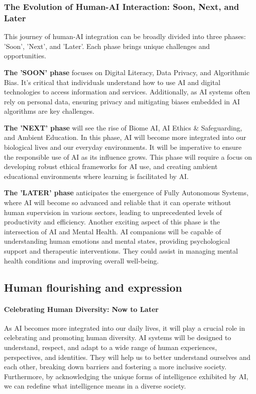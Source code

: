 \subsubsection{The Evolution of Human-AI Interaction: Soon, Next, and Later}
This journey of human-AI integration can be broadly divided into three phases: 'Soon', 'Next', and 'Later'. Each phase brings unique challenges and opportunities.\par 

\textbf{The 'SOON' phase} focuses on Digital Literacy, Data Privacy, and Algorithmic Bias. It's critical that individuals understand how to use AI and digital technologies to access information and services. Additionally, as AI systems often rely on personal data, ensuring privacy and mitigating biases embedded in AI algorithms are key challenges. \par

\textbf{The 'NEXT' phase} will see the rise of Biome AI, AI Ethics \& Safeguarding, and Ambient Education. In this phase, AI will become more integrated into our biological lives and our everyday environments. It will be imperative to ensure the responsible use of AI as its influence grows. This phase will require a focus on developing robust ethical frameworks for AI use, and creating ambient educational environments where learning is facilitated by AI.\par 

\textbf{The 'LATER' phase} anticipates the emergence of Fully Autonomous Systems, where AI will become so advanced and reliable that it can operate without human supervision in various sectors, leading to unprecedented levels of productivity and efficiency. Another exciting aspect of this phase is the intersection of AI and Mental Health. AI companions will be capable of understanding human emotions and mental states, providing psychological support and therapeutic interventions. They could assist in managing mental health conditions and improving overall well-being.

\subsection{Human flourishing and expression}
\paragraph{Celebrating Human Diversity: Now to Later}\par
As AI becomes more integrated into our daily lives, it will play a crucial role in celebrating and promoting human diversity. AI systems will be designed to understand, respect, and adapt to a wide range of human experiences, perspectives, and identities. They will help us to better understand ourselves and each other, breaking down barriers and fostering a more inclusive society. Furthermore, by acknowledging the unique forms of intelligence exhibited by AI, we can redefine what intelligence means in a diverse society.
